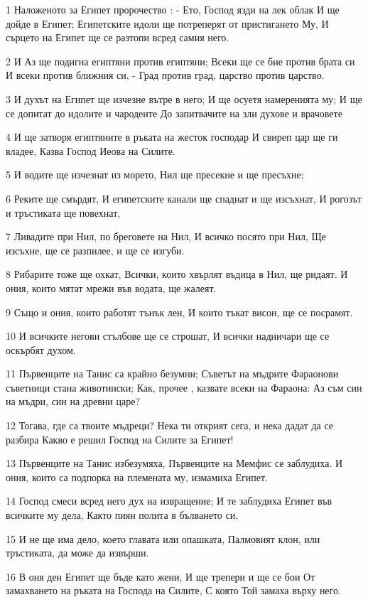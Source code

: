 \par 1 Наложеното за Египет пророчество : - Ето, Господ язди на лек облак И ще дойде в Египет; Египетските идоли ще потреперят от пристигането Му, И сърцето на Египет ще се разтопи всред самия него.
\par 2 И Аз ще подигна египтяни против египтяни; Всеки ще се бие против брата си И всеки против ближния си, - Град против град, царство против царство.
\par 3 И духът на Египет ще изчезне вътре в него; И ще осуетя намеренията му; И ще се допитат до идолите и чародеите До запитвачите на зли духове и врачовете
\par 4 И ще затворя египтяните в ръката на жесток господар И свиреп цар ще ги владее, Казва Господ Иеова на Силите.
\par 5 И водите ще изчезнат из морето, Нил ще пресекне и ще пресъхне;
\par 6 Реките ще смърдят, И египетските канали ще спаднат и ще изсъхнат, И рогозът и тръстиката ще повехнат,
\par 7 Ливадите при Нил, по бреговете на Нил, И всичко посято при Нил, Ще изсъхне, ще се разпилее, и ще се изгуби.
\par 8 Рибарите тоже ще охкат, Всички, които хвърлят въдица в Нил, ще ридаят. И ония, които мятат мрежи във водата, ще жалеят.
\par 9 Също и ония, които работят тънък лен, И които тъкат висон, ще се посрамят.
\par 10 И всичките негови стълбове ще се строшат, И всички надничари ще се оскърбят духом.
\par 11 Първенците на Танис са крайно безумни; Съветът на мъдрите Фараонови съветници стана животински; Как, прочее , казвате всеки на Фараона: Аз съм син на мъдри, син на древни царе?
\par 12 Тогава, где са твоите мъдреци? Нека ти открият сега, и нека дадат да се разбира Какво е решил Господ на Силите за Египет!
\par 13 Първенците на Танис избезумяха, Първенците на Мемфис се заблудиха. И ония, които са подпорка на племената му, измамиха Египет.
\par 14 Господ смеси всред него дух на извращение; И те заблудиха Египет във всичките му дела, Както пиян полита в бълването си,
\par 15 И не ще има дело, което главата или опашката, Палмовият клон, или тръстиката, да може да извърши.
\par 16 В оня ден Египет ще бъде като жени, И ще трепери и ще се бои От замахването на ръката на Господа на Силите, С която Той замаха върху него.

